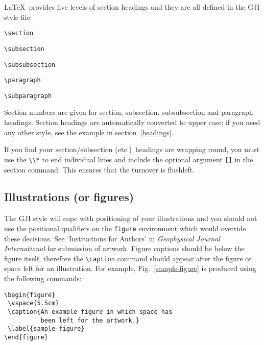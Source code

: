 \documentclass{gji}
\begin{document}
\LaTeX\ provides five levels of section headings and they are all
defined in the GJI style file:
\begin{description}
  \item \verb"\section"
  \item \verb"\subsection"
  \item \verb"\subsubsection"
  \item \verb"\paragraph"
  \item \verb"\subparagraph"
\end{description}
Section numbers are given for section, subsection, subsubsection
and paragraph headings.  Section headings are automatically converted to
upper case; if you need any other style, see the example in section~\ref{headings}.

If you find your section/subsection (etc.)\ headings are wrapping round,
you must use the \verb"\\*" to end individual lines and include the
optional argument \verb"[]" in the section command. This ensures that
the turnover is flushleft.

\subsection{Illustrations (or figures)}

\begin{figure*}
 \vspace{5.5cm}
     \caption{An example figure spanning two-columns
             in which space has been left for the artwork.}
     \label{twocol-figure}
\end{figure*}

The GJI style will cope with positioning of your illustrations and
you should not use the positional qualifiers on the
\verb"figure" environment which would override these decisions. See
`Instructions for Authors' in {\em Geophysical Journal International\/}
for submission of
artwork. Figure captions should be below the figure itself, therefore
the \verb"\caption" command should appear after the figure or space
left for an illustration. For example, Fig.~\ref{sample-figure} is
produced using the following commands:
\begin{verbatim}
\begin{figure}
 \vspace{5.5cm}
 \caption{An example figure in which space has
          been left for the artwork.}
 \label{sample-figure}
\end{figure}
\end{verbatim}
\end{document}

